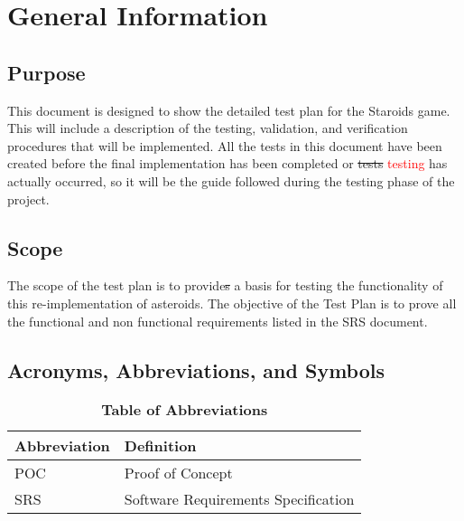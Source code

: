 \documentclass[12pt, titlepage]{article}
\begin{document}
\section{General Information}

\subsection{Purpose}
This document is designed to show the detailed test plan for the Staroids game. This will include a description of the testing, validation, and verification procedures that will be implemented. All the tests in this document have been created before the final implementation has been completed or \sout{tests} \textcolor{red}{testing} has actually occurred, so it will be the guide followed during the testing phase of the project.

\subsection{Scope}
The scope of the test plan is to provide\sout{s} a basis for testing the functionality of this re-implementation of asteroids. The objective of the Test Plan is to prove all the functional and non functional requirements listed in the SRS document.

\subsection{Acronyms, Abbreviations, and Symbols}

\begin{table}[hbp]
\caption{\textbf{Table of Abbreviations}} \label{Table}

\begin{tabularx}{\textwidth}{p{3cm}X}
\toprule
\textbf{Abbreviation} & \textbf{Definition} \\
\midrule
POC & Proof of Concept\\
SRS & Software Requirements Specification\\
\bottomrule
\end{tabularx}

\end{table}
\end{document}
